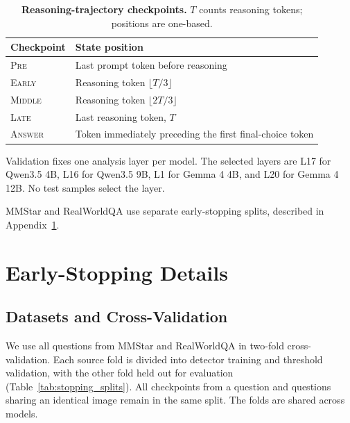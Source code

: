 \documentclass{article} %
\begin{document}
\begin{table}[H]
\centering\small
\renewcommand{\arraystretch}{1.05}
\setlength{\tabcolsep}{4pt}
\caption{\textbf{Reasoning-trajectory checkpoints.} $T$ counts reasoning tokens; positions are one-based.}
\label{tab:reasoning_checkpoints}
\begin{tabular*}{\textwidth}{@{\extracolsep{\fill}}lp{}@{}}
\toprule
Checkpoint & State position \\
\midrule
\textsc{Pre} & Last prompt token before reasoning \\
\textsc{Early} & Reasoning token $\lfloor T/3\rfloor$ \\
\textsc{Middle} & Reasoning token $\lfloor 2T/3\rfloor$ \\
\textsc{Late} & Last reasoning token, $T$ \\
\textsc{Answer} & Token immediately preceding the first final-choice token \\
\bottomrule
\end{tabular*}
\end{table}

Validation fixes one analysis layer per model. The selected layers are L17 for Qwen3.5 4B, L16 for Qwen3.5 9B, L1 for Gemma 4 4B, and L20 for Gemma 4 12B. No test samples select the layer.

MMStar and RealWorldQA use separate early-stopping splits, described in Appendix~\ref{app:early_stopping}.

\section{Early-Stopping Details}
\label{app:early_stopping}

\subsection{Datasets and Cross-Validation}

We use all questions from MMStar and RealWorldQA in two-fold cross-validation. Each source fold is divided into detector training and threshold validation, with the other fold held out for evaluation (Table~\ref{tab:stopping_splits}). All checkpoints from a question and questions sharing an identical image remain in the same split. The folds are shared across models.
\end{document}
